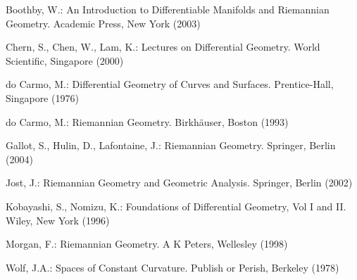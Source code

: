 \RGReferenceSection

\begin{description}[style=multiline,leftmargin=5em,labelwidth=4.5em,font=\normalfont]
\item[{[Boo03]}]Boothby, W.: An Introduction to Differentiable Manifolds and Riemannian Geometry. Academic Press, New York (2003)
\item[{[CCL00]}]Chern, S., Chen, W., Lam, K.: Lectures on Differential Geometry. World Scientific, Singapore (2000)
\item[{[dC76]}]do Carmo, M.: Differential Geometry of Curves and Surfaces. Prentice-Hall, Singapore (1976)
\item[{[dC93]}]do Carmo, M.: Riemannian Geometry. Birkhäuser, Boston (1993)
\item[{[GHL04]}]Gallot, S., Hulin, D., Lafontaine, J.: Riemannian Geometry. Springer, Berlin (2004)
\item[{[Jos02]}]Jost, J.: Riemannian Geometry and Geometric Analysis. Springer, Berlin (2002)
\item[{[KN96]}]Kobayashi, S., Nomizu, K.: Foundations of Differential Geometry, Vol I and II. Wiley, New York (1996)
\item[{[Mor98]}]Morgan, F.: Riemannian Geometry. A K Peters, Wellesley (1998)
\item[{[Wol78]}]Wolf, J.A.: Spaces of Constant Curvature. Publish or Perish, Berkeley (1978)
\end{description}
